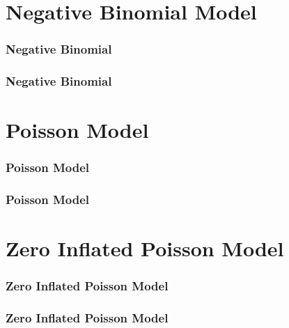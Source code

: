 \documentclass{beamer}
\begin{document}
	\section{Negative Binomial Model}
	\begin{frame}
		\frametitle{Negative Binomial}
	\end{frame}
	\begin{frame}
		\frametitle{Negative Binomial}
	\end{frame}
	
	\section{Poisson Model}
	\begin{frame}
		\frametitle{Poisson Model}
	\end{frame}
	\begin{frame}
		\frametitle{Poisson Model}
	\end{frame}
	
	\section{Zero Inflated Poisson Model}
	\begin{frame}
		\frametitle{Zero Inflated Poisson Model}
		
	\end{frame}
	\begin{frame}
		\frametitle{Zero Inflated Poisson Model}

	\end{frame}
	
\end{document}
